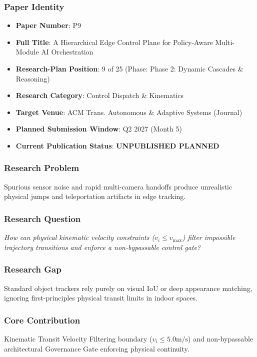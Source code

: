 \documentclass[11pt,letterpaper]{article}
\begin{document}
\subsubsection{Paper Identity}
\begin{itemize}[leftmargin=*]
    \item \textbf{Paper Number}: P9
    \item \textbf{Full Title}: A Hierarchical Edge Control Plane for Policy-\allowbreak Aware Multi-\allowbreak Module AI Orchestration
    \item \textbf{Research-Plan Position}: 9 of 25 (Phase: Phase 2: Dynamic Cascades \& Reasoning)
    \item \textbf{Research Category}: Control Dispatch \& Kinematics
    \item \textbf{Target Venue}: ACM Trans. Autonomous \& Adaptive Systems (Journal)
    \item \textbf{Planned Submission Window}: Q2 2027 (Month 5)
    \item \textbf{Current Publication Status}: \textbf{UNPUBLISHED PLANNED}
\end{itemize}

\subsubsection{Research Problem}
Spurious sensor noise and rapid multi-\allowbreak camera handoffs produce unrealistic physical jumps and teleportation artifacts in edge tracking.

\subsubsection{Research Question}
\begin{tcolorbox}[colback=blue!3!white,colframe=blue!50!black,title=Primary Scientific Question]
\textit{How can physical kinematic velocity constraints ($v_i \le v_{\max}$) filter impossible trajectory transitions and enforce a non-\allowbreak bypassable control gate?}
\end{tcolorbox}

\subsubsection{Research Gap}
Standard object trackers rely purely on visual IoU or deep appearance matching, ignoring first-\allowbreak principles physical transit limits in indoor spaces.

\subsubsection{Core Contribution}
Kinematic Transit Velocity Filtering boundary ($v_i \le 5.0\text{m/s}$) and non-\allowbreak bypassable architectural Governance Gate enforcing physical continuity.
\end{document}
